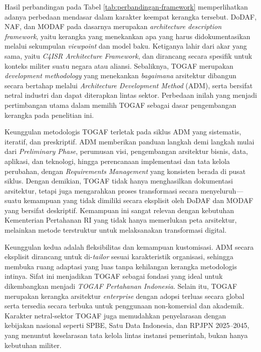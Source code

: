 Hasil perbandingan pada Tabel \ref{tab:perbandingan-framework} memperlihatkan adanya perbedaan mendasar dalam karakter keempat kerangka tersebut.
DoDAF, NAF, dan MODAF pada dasarnya merupakan \textit{architecture description framework}, yaitu kerangka yang menekankan apa yang harus didokumentasikan melalui sekumpulan \textit{viewpoint} dan model baku.
Ketiganya lahir dari akar yang sama, yaitu \textit{C4ISR Architecture Framework}, dan dirancang secara spesifik untuk konteks militer suatu negara atau aliansi.
Sebaliknya, TOGAF merupakan \textit{development methodology} yang menekankan \textit{bagaimana} arsitektur dibangun secara bertahap melalui \textit{Architecture Development Method} (ADM), serta bersifat netral industri dan dapat diterapkan lintas sektor.
Perbedaan inilah yang menjadi pertimbangan utama dalam memilih TOGAF sebagai dasar pengembangan kerangka pada penelitian ini.

Keunggulan metodologis TOGAF terletak pada siklus ADM yang sistematis, iteratif, dan preskriptif.
ADM memberikan panduan langkah demi langkah mulai dari \textit{Preliminary Phase}, perumusan visi, pengembangan arsitektur bisnis, data, aplikasi, dan teknologi, hingga perencanaan implementasi dan tata kelola perubahan, dengan \textit{Requirements Management} yang konsisten berada di pusat siklus.
Dengan demikian, TOGAF tidak hanya menghasilkan dokumentasi arsitektur, tetapi juga mengarahkan proses transformasi secara menyeluruh---suatu kemampuan yang tidak dimiliki secara eksplisit oleh DoDAF dan MODAF yang bersifat deskriptif.
Kemampuan ini sangat relevan dengan kebutuhan Kementerian Pertahanan RI yang tidak hanya memerlukan peta arsitektur, melainkan metode terstruktur untuk melaksanakan transformasi digital.

Keunggulan kedua adalah fleksibilitas dan kemampuan kustomisasi.
ADM secara eksplisit dirancang untuk di-\textit{tailor} sesuai karakteristik organisasi, sehingga membuka ruang adaptasi yang luas tanpa kehilangan kerangka metodologis intinya.
Sifat ini menjadikan TOGAF sebagai fondasi yang ideal untuk dikembangkan menjadi \textit{TOGAF Pertahanan Indonesia}.
Selain itu, TOGAF merupakan kerangka arsitektur \textit{enterprise} dengan adopsi terluas secara global serta tersedia secara terbuka untuk penggunaan non-komersial dan akademik.
Karakter netral-sektor TOGAF juga memudahkan penyelarasan dengan kebijakan nasional seperti SPBE, Satu Data Indonesia, dan RPJPN 2025--2045, yang menuntut keselarasan tata kelola lintas instansi pemerintah, bukan hanya kebutuhan militer.

